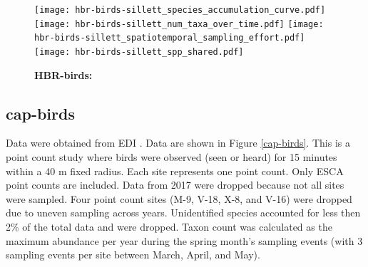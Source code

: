\documentclass[11pt, oneside]{article}
\begin{document}
\begin{figure}[h!]
\centering
\texttt{[image: hbr-birds-sillett\_species\_accumulation\_curve.pdf]}
\texttt{[image: hbr-birds-sillett\_num\_taxa\_over\_time.pdf]}
\texttt{[image: hbr-birds-sillett\_spatiotemporal\_sampling\_effort.pdf]}
\texttt{[image: hbr-birds-sillett\_spp\_shared.pdf]}
\caption{{\bf HBR-birds:} }
\label{hbr-birds}
\end{figure}

\subsection{cap-birds}
Data were obtained from EDI \citep{cap-birds}.
Data are shown in Figure \ref{cap-birds}.
This is a point count study where birds were observed (seen or heard) for 15 minutes within a 40 m fixed radius. 
Each site represents one point count. 
Only ESCA point counts are included. 
Data from 2017 were dropped because not all sites were sampled. 
Four point count sites (M-9, V-18, X-8, and V-16) were dropped due to uneven sampling across years. 
Unidentified species accounted for less then 2\% of the total data and were dropped. 
Taxon count was calculated as the maximum abundance per year during the spring month's sampling events (with 3 sampling events per site between March, April, and May). 
  
\end{document}
